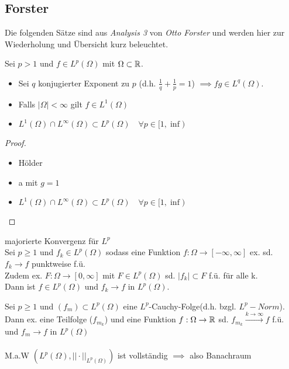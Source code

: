 

\subsection{Forster}

Die folgenden S\"atze sind aus \textit{Analysis 3} von \textit{Otto Forster} und werden hier zur Wiederholung und Übersicht kurz beleuchtet.
\enter

\begin{satz}
	Sei $p > 1$ und $f \in L^p(\Omega)$ mit $\Omega \subset \mathbb{R}$. 
	\begin{itemize}
		\item Sei $q$ konjugierter Exponent zu $p$ (d.h. $\frac{1}{q} + \frac{1}{p}=1$)
			$\implies fg \in L^q(\Omega)$.
		\item Falls $|\Omega| < \infty$ gilt $f \in L^1(\Omega)$
		\item $ L^1(\Omega) \cap L^{\infty}(\Omega) \subset L^p(\Omega) \quad \forall p\in [1,\inf) $
	\end{itemize}
\end{satz}

\begin{proof}
	\enter
	\begin{itemize}
		\item H\"older
		\item a mit $g=1$
		\item $ L^1(\Omega) \cap L^{\infty}(\Omega) \subset L^p(\Omega) \quad \forall p\in [1,\inf) $
	\end{itemize}

\end{proof}

\begin{satz}{majorierte Konvergenz für $L^p$}
	\\
	Sei $p \geq 1$ und $f_k \in L^p(\Omega)$ sodass eine Funktion $f:\Omega\to [-\infty,\infty]$ ex. sd. $f_k \to f$ punktweise f.\"u.\\
	Zudem ex. $F: \Omega \to [0,\infty]$ mit $F \in L^p(\Omega)$ sd. 
	$|f_k| \subset F$ f.\"u. f\"ur alle k.\\
	Dann ist $f\in L^p(\Omega)$ und $f_k \to f $ in $L^p(\Omega)$.
\end{satz}

\begin{satz}
	Sei $p \geq 1$ und $(f_m) \subset L^p(\Omega)$ eine $L^p$-Cauchy-Folge(d.h. bzgl. $L^p-Norm$). Dann ex. eine Teilfolge ($f_{m_k}$) und eine Funktion $f:\Omega\to \mathbb{R}$ sd. $f_{m_k} \overset{k\to \infty}{\longrightarrow} f$ f.\"u. und $f_m \to f$ in $L^p(\Omega)$
	\\
	\\
	M.a.W \quad $\left(L^p(\Omega), ||\cdot||_{L^p(\Omega)}\right)$ ist vollst\"andig $\implies$ also Banachraum
\end{satz}

